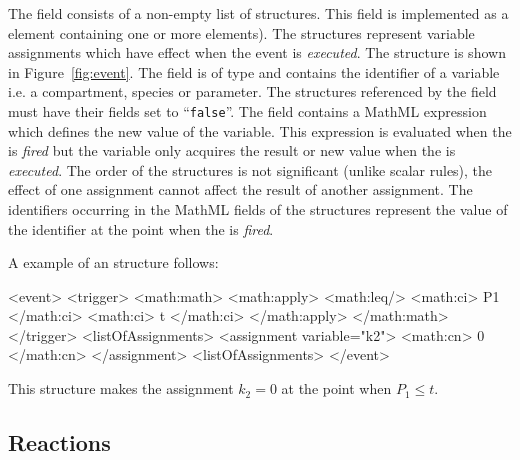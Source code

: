 \documentclass[10pt]{cekarticle}
\begin{document}
\subsubsection{}
The  field consists of a non-empty list of
 structures.  This field is implemented as a
 element containing one or more
 elements).  The 
structures represent variable assignments which have effect when
the event is \emph{executed}. The  structure is
shown in Figure~\ref{fig:event}. The  field is of
type  and contains the identifier of a variable i.e. a
compartment, species or parameter.  The structures referenced by
the  field must have their 
fields set to ``\texttt{false}''.  The  field
contains a MathML expression which defines the new value of the
variable.  This expression is evaluated when the  is
\emph{fired} but the variable only acquires the result or new
value when the  is \emph{executed}.  The order of the
 structures is not significant (unlike
scalar rules), the effect of one assignment cannot affect the
result of another assignment.  The identifiers occurring in the
MathML  fields of the 
structures represent the value of the identifier at the point when
the  is \emph{fired}.

A example of an  structure follows:

\begin{example}
<event>
    <trigger>
        <math:math>
            <math:apply>
                <math:leq/>
                <math:ci> P1 </math:ci>
                <math:ci> t </math:ci>
            </math:apply>
        </math:math>
    </trigger>
    <listOfAssignments>
        <assignment variable="k2">
            <math:cn> 0 </math:cn>
        </assignment>
    <listOfAssignments>
</event>
\end{example}

This structure makes the assignment $k_2 = 0$ at the point when
$P_1 \leq t$.

\subsection{Reactions}
\label{sec:reactions}
\end{document}

